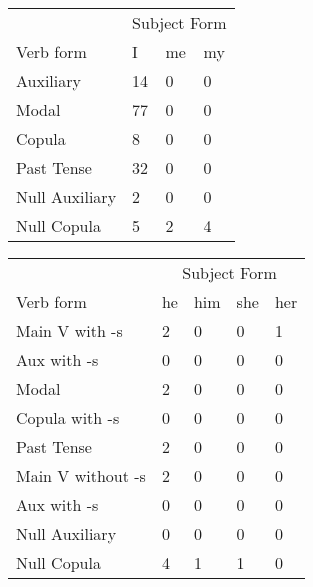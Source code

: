 \begin{table}[]
    \begin{minipage}{0.5\textwidth}
    \centering
    \begin{tabular}{@{}llll@{}}
        \toprule
            &\multicolumn{3}{c}{Subject Form}\\
            \cline{2-4}
        Verb form & I & me & my \\
        \midrule
        Auxiliary & 14 & 0 & 0 \\
        Modal & 77 & 0 & 0 \\
        Copula & 8 & 0 & 0 \\
        Past Tense & 32 & 0 & 0 \\
        \hline
        Null Auxiliary & 2 & 0 & 0 \\
        Null Copula & 5 & 2 & 4 \\
        \bottomrule
    \end{tabular}
\end{minipage}
\begin{minipage}{0.5\textwidth}
    \centering
    \begin{tabular}{@{}lllll@{}}
        \toprule
            &\multicolumn{4}{c}{Subject Form}\\
            \cline{2-5}
        Verb form & he & him & she & her \\
        \midrule
        Main V with -s & 2 & 0 & 0 & 1 \\
        Aux with -s & 0 & 0 & 0 & 0 \\
        Modal & 2 & 0 & 0 & 0 \\
        Copula with -s & 0 & 0 & 0 & 0 \\
        Past Tense & 2 & 0 & 0 & 0 \\
        \hline
        Main V without -s & 2 & 0 & 0 & 0 \\
        Aux with -s & 0 & 0 & 0 & 0 \\
        Null Auxiliary & 0 & 0 & 0 & 0 \\
        Null Copula & 4 & 1 & 1 & 0 \\
        \bottomrule
    \end{tabular}
\end{minipage}
\end{table}



